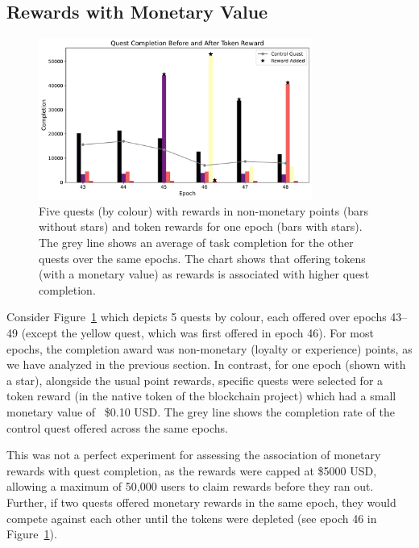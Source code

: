 
\subsection{Rewards with Monetary Value}
\label{sec:rewards}

\begin{figure}[t]
    \centering
    \includegraphics[width=0.8\textwidth]{figures/tokens.pdf}
    \caption{Five quests (by colour) with rewards in non-monetary points (bars without stars) and token rewards for one epoch (bars with stars). The grey line shows an average of task completion for the other quests over the same epochs. The chart shows that offering tokens (with a monetary value) as rewards is associated with higher quest completion. \label{fig:tokens}}
\end{figure}

Consider Figure~\ref{fig:tokens} which depicts 5 quests by colour, each offered over epochs 43--49 (except the yellow quest, which was first offered in epoch 46). For most epochs, the completion award was non-monetary (loyalty or experience) points, as we have analyzed in the previous section. In contrast, for one epoch (shown with a star), alongside the usual point rewards, specific quests were selected for a token reward (in the native token of the blockchain project) which had a small monetary value of ~\$0.10 USD. The grey line shows the completion rate of the control quest offered across the same epochs.

This was not a perfect experiment for assessing the association of monetary rewards with quest completion, as the rewards were capped at \$5000 USD, allowing a maximum of 50,000 users to claim rewards before they ran out. Further, if two quests offered monetary rewards in the same epoch, they would compete against each other until the tokens were depleted (see epoch 46 in Figure~\ref{fig:tokens}).

